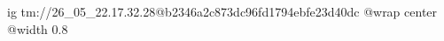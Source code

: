  
 
 
 
 

\qqSecOrig


\ifcmt
  ig tm://26_05_22.17.32.28@b2346a2c873dc96fd1794ebfe23d40dc
  @wrap center
  @width 0.8
\fi

